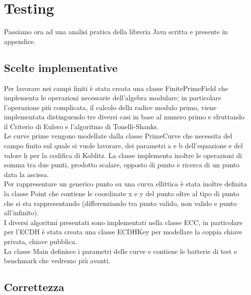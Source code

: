 \documentclass{article}
\begin{document}
	\clearpage
	
	\section{Testing}
	
	Passiamo ora ad una analisi pratica della libreria Java scritta e presente in appendice.
	
	\subsection{Scelte implementative}
	
	Per lavorare nei campi finiti è stata creata una classe FinitePrimeField che implementa le operazioni
	necessarie dell'algebra modulare; in particolare l'operazione più complicata, il calcolo della radice modulo primo,
	viene implementata distinguendo tre diversi casi in base al numero primo e sfruttando il Criterio di Eulero e l'algoritmo
	di Tonelli-Shanks. \\
	
	Le curve prime vengono modellate dalla classe PrimeCurve che necessita del campo finito sul quale si vuole lavorare,
	dei parametri a e b dell'equazione e del valore h per la codifica di Koblitz. La classe implementa inoltre le operazioni di
	somma tra due punti, prodotto scalare, opposto di punto e ricerca di un punto data la ascissa. \\
	
	Per rappresentare un generico punto su una curva ellittica è stata inoltre definita la classe Point
	che contiene le coordinate x e y del punto oltre al tipo di punto che si sta rappresentando 
	(differenziando tra punto valido, non valido e punto all'infinito).\\
	
	I diversi algoritmi presentati sono implementati nella classe ECC, in particolare
	per l'ECDH è stata creata una classe ECDHKey per modellare la coppia chiave privata, chiave pubblica.\\
	
	La classe Main definisce i parametri delle curve e contiene le batterie di test e benchmark che vedremo più avanti.
	
	\clearpage
	\subsection{Correttezza}
	
\end{document}
